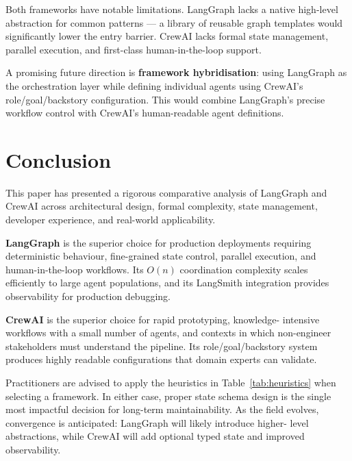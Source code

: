 \documentclass[12pt,a4paper]{article}
\begin{document}
Both frameworks have notable limitations. LangGraph lacks a native high-level
abstraction for common patterns --- a library of reusable graph templates would
significantly lower the entry barrier. CrewAI lacks formal state management,
parallel execution, and first-class human-in-the-loop support.

A promising future direction is \textbf{framework hybridisation}: using
LangGraph as the orchestration layer while defining individual agents using
CrewAI's role/goal/backstory configuration. This would combine LangGraph's
precise workflow control with CrewAI's human-readable agent definitions.

\section{Conclusion}

This paper has presented a rigorous comparative analysis of LangGraph and
CrewAI across architectural design, formal complexity, state management,
developer experience, and real-world applicability.

\textbf{LangGraph} is the superior choice for production deployments requiring
deterministic behaviour, fine-grained state control, parallel execution, and
human-in-the-loop workflows. Its $O(n)$ coordination complexity scales
efficiently to large agent populations, and its LangSmith integration provides
observability for production debugging.

\textbf{CrewAI} is the superior choice for rapid prototyping, knowledge-
intensive workflows with a small number of agents, and contexts in which
non-engineer stakeholders must understand the pipeline. Its role/goal/backstory
system produces highly readable configurations that domain experts can validate.

Practitioners are advised to apply the heuristics in Table~\ref{tab:heuristics}
when selecting a framework. In either case, proper state schema design is the
single most impactful decision for long-term maintainability. As the field
evolves, convergence is anticipated: LangGraph will likely introduce higher-
level abstractions, while CrewAI will add optional typed state and improved
observability.

\newpage


\end{document}

